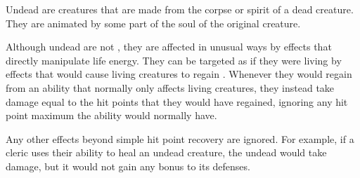   Undead are creatures that are made from the corpse or spirit of a dead creature.
  They are animated by some part of the soul of the original creature.

  Although undead are not , they are affected in unusual ways by effects that directly manipulate life energy.
  They can be targeted as if they were living  by \magical effects that would cause living creatures to regain .
  Whenever they would regain  from an ability that normally only affects living creatures, they instead take damage equal to the hit points that they would have regained, ignoring any hit point maximum the ability would normally have.

  Any other effects beyond simple hit point recovery are ignored.
  For example, if a cleric uses their  ability to heal an undead creature, the undead would take damage, but it would not gain any bonus to its defenses.

